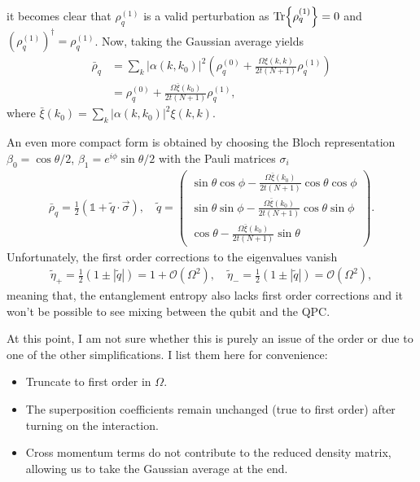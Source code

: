 \documentclass{article}
\newcommand{\Id}{\mathds{1}}
\begin{document}
  it becomes clear that $\rho_q^{(1)}$ is a valid perturbation as $\Tr{\rho_q^{(1)}}=0$ and $(\rho_q^{(1)})^\dagger = \rho_q^{(1)}$. Now, taking the Gaussian average yields
  \begin{align}
    \bar{\rho}_q & = \sum_k |\alpha(k,k_0)|^2 \left(\rho_q^{(0)}   + \frac{\Omega \xi(k,k)}{2t(N+1)}\rho_q^{(1)} \right) \nonumber \\
     & = \rho_q^{(0)}   + \frac{\Omega \bar{\xi}(k_0)}{2t(N+1)}\rho_q^{(1)},
  \end{align} 
where $\bar{\xi}(k_0) =  \sum_k |\alpha(k,k_0)|^2 \xi(k,k)$. 

An even more compact form is obtained by choosing the Bloch representation $\beta_0 = \cos\theta/2$, $\beta_1 = e^{i\phi}\sin\theta/2$ with the Pauli matrices $\sigma_i$
\begin{align}
    \bar{\rho}_q = \frac{1}{2}\left( \Id + \tilde{q}\cdot \vec{\sigma} \right), \quad 
    \tilde{q} = \begin{pmatrix}
        \sin\theta\cos\phi - \frac{\Omega \bar{\xi}(k_0)}{2t(N+1)} \cos\theta \cos\phi\\
        \sin\theta\sin\phi - \frac{\Omega \bar{\xi}(k_0)}{2t(N+1)} \cos\theta \sin\phi \\
        \cos\theta - \frac{\Omega \bar{\xi}(k_0)}{2t(N+1)} \sin\theta 
    \end{pmatrix}.
\end{align}
Unfortunately, the first order corrections to the eigenvalues vanish
\begin{align}
    \tilde{\eta}_{+} = \frac{1}{2}(1\pm|\tilde{q}|) = 1 + \mathcal{O}(\Omega^2), \quad  \tilde{\eta}_{-} = \frac{1}{2}(1\pm|\tilde{q}|) =  \mathcal{O}(\Omega^2),
\end{align}
meaning that, the entanglement entropy also lacks first order corrections and it won't be possible to see mixing between the qubit and the QPC. 

At this point, I am not sure whether this is purely an issue of the order or due to one of the other simplifications. I list them here for convenience:
\begin{itemize}
    \item Truncate to first order in $\Omega$.
    \item The superposition coefficients remain unchanged (true to first order) after turning on the interaction.
    \item Cross momentum terms do not contribute to the reduced density matrix, allowing us to take the Gaussian average at the end. 
\end{itemize}



\end{document}
